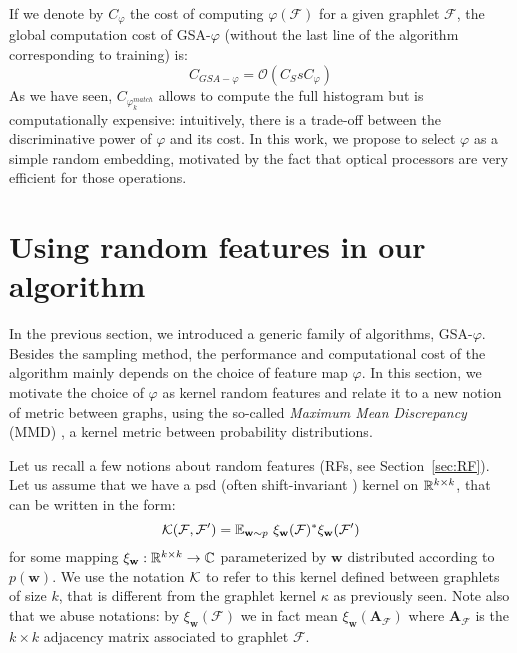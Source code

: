 If we denote by $C_\varphi$ the cost of computing $\varphi(\mathcal{F})$ for a given graphlet $\mathcal{F}$, the global computation cost of GSA-$\varphi$ (without the last line of the algorithm corresponding to training) is:
\begin{equation}
C_{GSA-\varphi} = \mathcal{O}(C_S s C_\varphi)
\end{equation}
As we have seen, $C_{\varphi^{match}_k}$ allows to compute the full histogram but is computationally expensive: intuitively, there is a trade-off between the discriminative power of $\varphi$ and its cost. In this work, we propose to select $\varphi$ as a simple random embedding, motivated by the fact that optical processors are very efficient for those operations. 

\section{Using random features in our algorithm}

In the previous section, we introduced a generic family of algorithms, GSA-$\varphi$. Besides the sampling method, the performance and computational cost of the algorithm mainly depends on the choice of feature map $\varphi$. In this section, we motivate the choice of $\varphi$ as kernel random features  and relate it to a new notion of metric between graphs, using the so-called \emph{Maximum Mean Discrepancy} (MMD) \citep{gretton}, a kernel metric between probability distributions.

Let us recall a few notions about random features (RFs, see Section~\ref{sec:RF}). Let us assume that we have a psd (often shift-invariant ) kernel on $\mathbb{R}^{k \times k}$, that can be written in the form:
\begin{equation}
\label{eq:random_features_3}
\mathcal{K}(\mathcal{F},\mathcal{F}')= \mathbb{E}_{\mathbf{w} \sim p}~ \xi_\mathbf{w}(\mathcal{F})^* \xi_\mathbf{w}(\mathcal{F}')
\end{equation}
for some mapping $\xi_\mathbf{w} : \mathbb{R}^{k \times k} \to \mathbb{C}$ parameterized by $\mathbf{w}$ distributed according to $p(\mathbf{w})$. We use the notation $\mathcal{K}$ to refer to this kernel defined between graphlets of size $k$, that is different from the graphlet kernel $\kappa$ as previously seen. Note also that we abuse notations: by $\xi_\mathbf{w}(\mathcal{F})$ we in fact mean $\xi_\mathbf{w}(\mathbf{A}_\mathcal{F})$ where $\mathbf{A}_\mathcal{F}$ is the $k\times k$ adjacency matrix associated to graphlet $\mathcal{F}$. 

